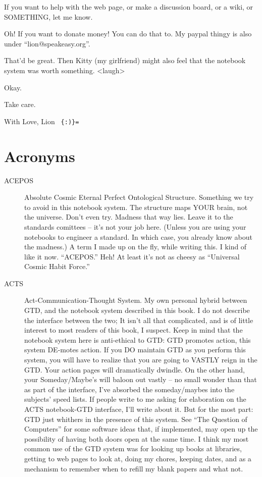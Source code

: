 \documentclass[oneside]{scrbook}
\begin{document}
If you want to help with the web page, or make a discussion board, or
a wiki, or SOMETHING, let me know.

Oh! If you want to donate money! You can do that to. My paypal thingy
is also under ``lion@speakeasy.org''.

That'd be great. Then Kitty (my girlfriend) might also feel that the
notebook system was worth something. <laugh>

Okay.

Take care.

With Love,
  Lion \verb| {:)}= |

\appendix

\chapter{Acronyms}
\begin{description}

\item[ACEPOS] Absolute Cosmic Eternal Perfect Ontological
Structure. Something we try to avoid in this notebook system. The
structure maps YOUR brain, not the universe. Don't even try. Madness
that way lies. Leave it to the standards comittees -- it's not your job
here. (Unless you are using your notebooks to engineer a standard. In
which case, you already know about the madness.) A term I made up on
the fly, while writing this. I kind of like it now. ``ACEPOS.'' Heh! At
least it's not as cheesy as ``Universal Cosmic Habit Force.''

\item[ACTS] Act-Communication-Thought System. My own personal hybrid
between GTD, and the notebook system described in this book. I do not
describe the interface between the two; It isn't all that complicated,
and is of little interest to most readers of this book, I
suspect. Keep in mind that the notebook system here is anti-ethical to
GTD: GTD promotes action, this system DE-motes action. If you DO
maintain GTD as you perform this system, you will have to realize that
you are going to VASTLY reign in the GTD. Your action pages will
dramatically dwindle. On the other hand, your Someday/Maybe's will
baloon out vastly -- no small wonder than that as part of the interface,
I've absorbed the someday/maybes into the subjects' speed lists. If
people write to me asking for elaboration on the ACTS notebook-GTD
interface, I'll write about it. But for the most part: GTD just
whithers in the presence of this system. See ``The Question of
Computers'' for some software ideas that, if implemented, may open up
the possibility of having both doors open at the same time. I think my
most common use of the GTD system was for looking up books at
libraries, getting to web pages to look at, doing my chores, keeping
dates, and as a mechanism to remember when to refill my blank papers
and what not.


\end{description}
\end{document}
